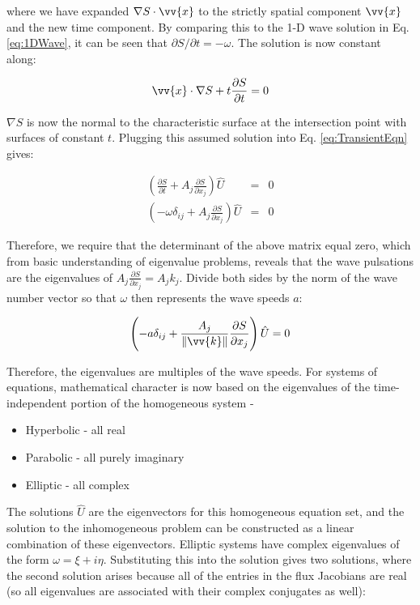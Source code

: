 \documentclass[10pt]{article}
\newcommand{\beq}{\begin{equation}}
\newcommand{\eeq}{\end{equation}}
\begin{document}
\begin{flushleft}
where we have expanded \(\nabla S\cdot\vv{x}\) to the strictly spatial component \(\vv{x}\) and the new time component. By comparing this to the 1-D wave solution in Eq. \eqref{eq:1DWave}, it can be seen that \(\partial S/\partial t=-\omega\). The solution is now constant along:

\beq
\label{eq:TransientConstant}
\vv{x}\cdot\nabla S+t\frac{\partial S}{\partial t}=0
\eeq

\(\nabla S\) is now the normal to the characteristic surface at the intersection point with surfaces of constant \(t\). Plugging this assumed solution into Eq. \eqref{eq:TransientEqn} gives:

\begin{subequations}
\begin{eqnarray}
\left(\frac{\partial S}{\partial t}+A_j\frac{\partial S}{\partial x_j}\right)\hat{U}&=&0\\
\left(-\omega\delta_{ij}+A_j\frac{\partial S}{\partial x_j}\right)\hat{U}&=&0
\end{eqnarray}
\end{subequations}

Therefore, we require that the determinant of the above matrix equal zero, which from basic understanding of eigenvalue problems, reveals that the wave pulsations are the eigenvalues of \(A_j\frac{\partial S}{\partial x_j}=A_jk_j\). Divide both sides by the norm of the wave number vector so that \(\omega\) then represents the wave speeds \(a\):

\beq
\left(-a\delta_{ij}+\frac{A_j}{\|\vv{k}\|}\frac{\partial S}{\partial x_j}\right)\hat{U}=0
\eeq

Therefore, the eigenvalues are multiples of the wave speeds. For systems of equations, mathematical character is now based on the eigenvalues of the time-independent portion of the homogeneous system -

\begin{itemize}
\item Hyperbolic - all real
\item Parabolic - all purely imaginary
\item Elliptic - all complex
\end{itemize}

The solutions \(\hat{U}\) are the eigenvectors for this homogeneous equation set, and the solution to the inhomogeneous problem can be constructed as a linear combination of these eigenvectors. Elliptic systems have complex eigenvalues of the form \(\omega=\xi+i\eta\). Substituting this into the solution gives two solutions, where the second solution arises because all of the entries in the flux Jacobians are real (so all eigenvalues are associated with their complex conjugates as well):


\end{flushleft}
\end{document}
